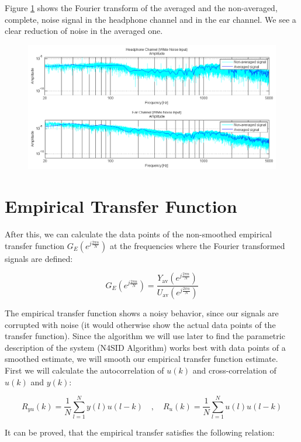 Figure \ref{} shows the Fourier transform of the averaged and the non-averaged, complete, noise signal in the headphone channel and in the ear channel. We see a clear reduction of noise in the averaged one.

\begin{figure}[h]
\centering
\includegraphics[width=1.0\textwidth]{pics/averagedvsnonaveraged}
\caption{}
\label{pic:}
\end{figure}


\section{Empirical Transfer Function}
After this, we can calculate the data points of the non-smoothed empirical transfer function $G_E(e^{j\frac{2\pi n}{N}})$ at the frequencies where the Fourier transformed signals are defined:

\[G_E(e^{j\frac{2\pi n}{N}}) = \frac{Y_\text{av}(e^{j\frac{2\pi n}{N}})}{U_\text{av}(e^{j\frac{2\pi n}{N}})}\]


The empirical transfer function shows a noisy behavior, since our signals are corrupted with noise (it would otherwise show the actual data points of the transfer function). Since the algorithm we will use later to find the parametric description of the system (N4SID Algorithm) works best with data points of a smoothed estimate, we will smooth our empirical transfer function estimate.\\

First we will calculate the autocorrelation of $u(k)$ and cross-correlation of $u(k)$ and $y(k)$:

\[R_{yu}(k) = \frac{1}{N}\sum\limits_{l = 1}^N y(l)u(l-k) \quad , \quad R_{u}(k) = \frac{1}{N}\sum\limits_{l = 1}^N u(l)u(l-k)\]

It can be proved, that the empirical transfer satisfies the following relation: 

